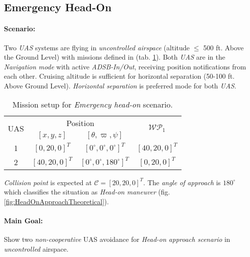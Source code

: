 \subsection{Emergency Head-On}\label{s:testEmergencyHeadOn}

\paragraph{Scenario:} Two  \emph{UAS} systems are flying in  \emph{uncontrolled airspace} (altitude $\le$ 500 ft. Above the Ground Level) with missions defined in (tab. \ref{tab:missionSetupEmergencyHeadOnScenario}). Both \emph{UAS} are in the  \emph{Navigation mode} with active \emph{ADSB-In/Out}, receiving position notifications from each other. Cruising altitude is sufficient for horizontal separation (50-100 ft. Above Ground Level). \emph{Horizontal separation} is preferred mode for both \emph{UAS}.


\begin{table}[H]
    \centering
    \begin{tabular}{c||c|c||c}
        \multirow{2}{*}{UAS} &\multicolumn{2}{c||}{Position} & \multirow{2}{*}{$\mathscr{WP}_1$} \\\cline{2-3}
          & $[x,y,z]$           & $[\theta,\varpi,\psi]$           & \\\hline\hline
        1 & $[0,20,0]^T $       & $[0^\circ,0^\circ,0^\circ]^T$    & $[40,20,0]^T$\\\hline 
        2 & $[40,20,0]^T $       & $[0^\circ,0^\circ,180^\circ]^T$  & $[0,20,0]^T$\\ 
    \end{tabular}
    \caption{Mission setup for \emph{Emergency head-on} scenario.}
    \label{tab:missionSetupEmergencyHeadOnScenario}
\end{table}


\begin{note}
\emph{Collision point} is expected at $\mathscr{C}=[20,20,0]^T$. The \emph{angle of approach} is $180^{\circ}$  which classifies the situation as \emph{Head-on maneuver} (fig. \ref{fig:HeadOnApproachTheoretical}).
\end{note}


\paragraph{Main Goal:} Show two \emph{non-cooperative } UAS avoidance for \emph{Head-on approach scenario} in \emph{uncontrolled} airspace.


